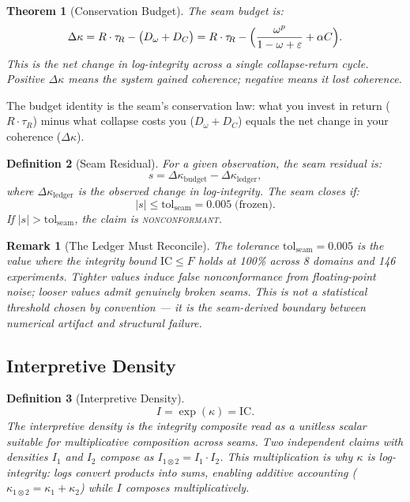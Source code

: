 \documentclass[
  aps,
  prd,
  preprint,
  superscriptaddress,
  nofootinbib,
  floatfix,
  longbibliography
]{revtex4-2}
\newtheorem{theorem}{Theorem}
\newtheorem{definition}[theorem]{Definition}
\newtheorem{remark}{Remark}
\newcommand{\tR}{\tau_{\!R}}
\newcommand{\eps}{\varepsilon}
\newcommand{\tolseam}{\mathrm{tol}_{\mathrm{seam}}}
\newcommand{\beq}{\begin{equation}}
\newcommand{\eeq}{\end{equation}}
\newcommand{\regime}[1]{\textnormal{\textsc{#1}}}
\newcommand{\nonconform}{\regime{nonconformant}}
\newcommand{\IC}{\mathrm{IC}}
\newcommand{\Fid}{F}
\newcommand{\Drft}{\omega}
\newcommand{\Curv}{C}
\newcommand{\Logint}{\kappa}
\begin{document}
\begin{theorem}[Conservation Budget]\label{thm:budget}
The seam budget is:
\beq\label{eq:budget}
  \Delta\Logint = R \cdot \tR
    - \bigl(D_\Drft + D_\Curv\bigr)
  = R \cdot \tR
    - \Bigl(\frac{\Drft^p}{1 - \Drft + \eps} + \alpha \Curv\Bigr).
\eeq
This is the net change in log-integrity across a single
collapse-return cycle.
Positive $\Delta\Logint$ means the system gained coherence;
negative means it lost coherence.
\end{theorem}

The budget identity is the seam's conservation law:
what you invest in return ($R \cdot \tR$) minus
what collapse costs you ($D_\Drft + D_\Curv$) equals
the net change in your coherence ($\Delta\Logint$).

\begin{definition}[Seam Residual]\label{def:residual}
For a given observation, the seam residual is:
\beq
  s = \Delta\Logint_{\mathrm{budget}}
    - \Delta\Logint_{\mathrm{ledger}},
\eeq
where $\Delta\Logint_{\mathrm{ledger}}$ is the observed
change in log-integrity.
The seam closes if:
\beq
  |s| \leq \tolseam = 0.005 \;\text{(frozen)}.
\eeq
If $|s| > \tolseam$, the claim is \nonconform{}.
\end{definition}

\begin{remark}[The Ledger Must Reconcile]
The tolerance $\tolseam = 0.005$ is the value where the
integrity bound $\IC \leq \Fid$ holds at 100\%
across 8 domains and 146 experiments.
Tighter values induce false nonconformance from
floating-point noise; looser values admit genuinely
broken seams.
This is not a statistical threshold chosen by convention
— it is the seam-derived boundary between numerical
artifact and structural failure.
\end{remark}

\subsection{Interpretive Density}

\begin{definition}[Interpretive Density]\label{def:I}
\beq
  I = \exp(\Logint) = \IC.
\eeq
The interpretive density is the integrity composite read
as a unitless scalar suitable for multiplicative
composition across seams.
Two independent claims with densities $I_1$ and $I_2$
compose as $I_{1 \otimes 2} = I_1 \cdot I_2$.
This multiplication is why $\Logint$ is
\emph{log}-integrity: logs convert products into sums,
enabling additive accounting ($\Logint_{1 \otimes 2}
= \Logint_1 + \Logint_2$) while $I$ composes
multiplicatively.
\end{definition}
\end{document}
